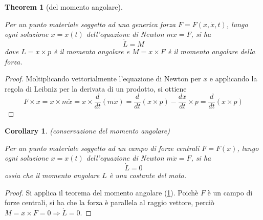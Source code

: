 \documentclass{article}
\newtheorem{theorem}{Theorem}[section]
\newtheorem{corollary}{Corollary}[theorem]
\begin{document}
            \begin{theorem}[del momento angolare]
                \label{thm:momento angolare}

                Per un punto materiale soggetto ad una generica forza $F = F(x, \dot{x}, t)$, lungo ogni soluzione $x = x(t)$ dell'equazione di Newton $m \ddot{x} = F$, si ha
                \[ \dot{L} = M \] dove $L = x \times p$ è il momento angolare e $M = x \times F $ è il momento angolare della forza.
                
            \end{theorem}
            \begin{proof}
                
                Moltiplicando vettorialmente l'equazione di Newton per $x$ e applicando la regola di Leibniz per la derivata di un prodotto, si ottiene
                \[ F \times x = x \times m \ddot{x} = x \times \frac{d}{dt}(m\dot{x}) = \frac{d}{dt}(x \times p) - \frac{dx}{dt} \times p = \frac{d}{dt}(x \times p) \]
           
            \end{proof}

            \begin{corollary}(conservazione del momento angolare)
                \label{cor:conservazione del momento angolare}

                Per un punto materiale soggetto ad un campo di forze centrali $F = F(x)$, lungo ogni soluzione $x = x(t)$ dell'equazione di Newton $m \ddot{x} = F$, si ha
                \[ \dot{L} = 0 \] ossia che il momento angolare $L$ è una costante del moto.

            \end{corollary}
            \begin{proof}

                Si applica il teorema del momento angolare (\ref{thm:momento angolare}). Poichè $F$ è un campo di forze centrali, si ha che la forza è parallela al raggio vettore,
                perciò $ M =  x \times F = 0 \Longrightarrow \dot{L} = 0 $.

            \end{proof}
\end{document}
